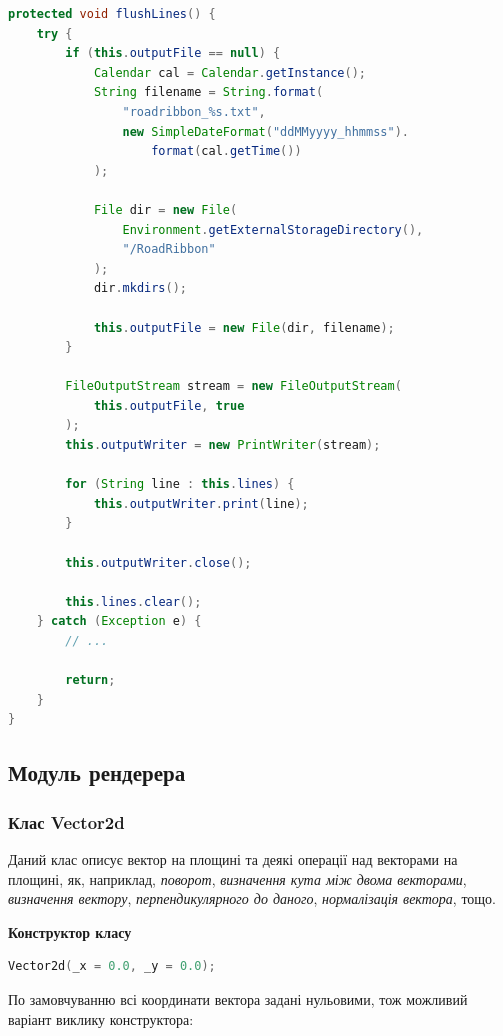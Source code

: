 \documentclass[simple,a4paper,14pt,ukrainian,utf8]{eskdtext}
\begin{document}
\begin{lstlisting}[language=Java]
protected void flushLines() {
    try {
        if (this.outputFile == null) {
            Calendar cal = Calendar.getInstance();
            String filename = String.format(
            	"roadribbon_%s.txt",
                new SimpleDateFormat("ddMMyyyy_hhmmss").
                	format(cal.getTime())
            );

            File dir = new File(
            	Environment.getExternalStorageDirectory(), 
            	"/RoadRibbon"
            );
            dir.mkdirs();

            this.outputFile = new File(dir, filename);
        }

        FileOutputStream stream = new FileOutputStream(
        	this.outputFile, true
        );
        this.outputWriter = new PrintWriter(stream);

        for (String line : this.lines) {
            this.outputWriter.print(line);
        }

        this.outputWriter.close();

        this.lines.clear();
    } catch (Exception e) {
        // ...

        return;
    }
}
\end{lstlisting}
        
     \subsection{Модуль рендерера}
     
     	\subsubsection{Клас Vector2d}
     	
     		Даний клас описує вектор на площині та деякі операції над векторами на площині, як, наприклад, \textit{поворот}, \textit{визначення кута між двома векторами}, \textit{визначення вектору}, \textit{перпендикулярного до даного}, \textit{нормалізація вектора}, тощо.
     	
        	\textbf{Конструктор класу}

            \begin{lstlisting}[language=C++]
            Vector2d(_x = 0.0, _y = 0.0);
            \end{lstlisting}

            По замовчуванню всі координати вектора задані нульовими, тож можливий варіант виклику конструктора:
\end{document}
